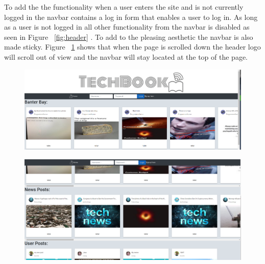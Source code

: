 To add the the functionality when a user enters the site and is not currently logged in the navbar contains a log in form that enables a user to log in. As long as a user is not logged in all other functionality from the navbar is disabled as seen in Figure ~\ref{fig:header} . To add to the pleasing aesthetic the navbar is also made sticky. Figure ~\ref{fig:headerStick} shows that when the page is scrolled down the header logo will scroll out of view and the navbar will stay located at the top of the page.

\begin{figure}[H]
\centering
\begin{minipage}{.5\textwidth}
  \centering
  \includegraphics[width=.9\linewidth]{img/ui/headerPC.PNG}
  \label{fig:header}
\end{minipage}%
\begin{minipage}{.5\textwidth}
  \centering
  \includegraphics[width=.9\linewidth]{img/ui/headerpcsticky.PNG}
  \label{fig:headerStick}
\end{minipage}
\end{figure}

